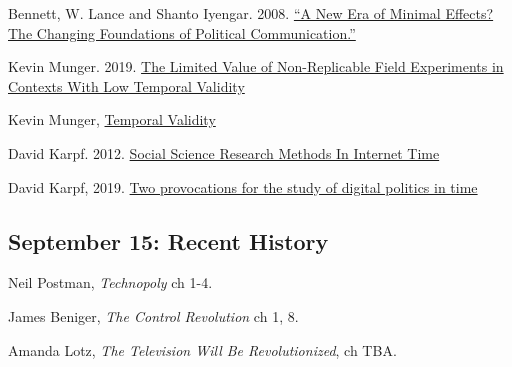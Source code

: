 \vspace{-.1in}\documentclass[11pt]{article}
\begin{document}
\noindent Bennett, W. Lance and Shanto Iyengar. 2008. \href{https://watermark.silverchair.com/jjnlcom0707.pdf?token=AQECAHi208BE49Ooan9kkhW_Ercy7Dm3ZL_9Cf3qfKAc485ysgAAAuMwggLfBgkqhkiG9w0BBwagggLQMIICzAIBADCCAsUGCSqGSIb3DQEHATAeBglghkgBZQMEAS4wEQQMxeWmnFmyhtJ1QIhvAgEQgIIClvh7EVCxMWBMC914ltsWhroj0SSXor8T5zs_WNx5ROp4s7nw6UtLcbtgtw8yXDv5GvqR200PI2XpdGtp9Nz11PuXIktWBU3SawPu_RbYz82G-iGCsafeQT4W8o6TO_nsjaFSF_m4M_ON1ECqmh3-oH6wXkCUrbgBdW26hl08OWeJy_bloCzMpGfYmb9y4j8JI20QcaNlWuB9Wx2uQgfwi06Eo1kyHmnmSVV9H4nXKK4iWmPwy8uSsdMkkUTpc15dtVtGgI_DKiQN66NVzqg-70vY5dSjjOKO61nNJZzjZy_r0TY3D-5xL2TmxEyn_09gHaWFkUf8wIcorY5xTTDd7-K08ee1jeeSQE-xaoCbkHSh_XhZVGT5OBiVy5KDhrDMe6ZMPp_DVqfKohzHNMoMRHlaiMXVLhLkDUXmFA9Xxk0jdKRKdmoaloKpKOsxN3pvU5GGu-NM4MXBkdlZmIvOnFP0vsEMoqH-1Y1YeupnnkAMh2ATKDpz_nFQK_84THWs-YsnzqnUm76PeRjKw_1fqjiZyg0kaHjP2EBHdg3qZjno1sa06y_ZM0FGklD7I5pXxbXFPIO4DjphpWHra-cKUZTImlIKcA-c27J5Yb5VCmFvI7RPcCM1SU-IZQPOkTQqzHcm211jURLtQ6rOj0umWzNh9-Cx065iMxFZJs7urqiDPYIvPeJgbCtm3NDDHQWRxzilqoXmN2kor3m7Bq-pUiDRd-TPyNtAKO4mEB_AYiLb7fJLnJ9VidSAWj9mfqXNX8qfyW0ozReaidr4DOKUX9q-OT-fm3zzwYaQpUqxHOHiLysY_fpGJ0erbJ1QAq7ihVHRuVFajJ1oc1gXj-F4G28qw4v54T1ve3_r4pxxYlSmZPdaMb7y}{``A New Era of Minimal Effects? The Changing Foundations of Political Communication.'' }


\noindent Kevin Munger. 2019. \href{https://journals.sagepub.com/doi/full/10.1177/2056305119859294}{The Limited Value of Non-Replicable Field Experiments in Contexts With Low Temporal Validity}


\noindent Kevin Munger, \href{https://osf.io/ca5wz/}{Temporal Validity}

\noindent David Karpf. 2012. \href{http://sciencepolicy.colorado.edu/students/envs_5720/karpf_2012.pdf}{Social Science Research Methods In Internet Time }

\noindent David Karpf, 2019. \href{https://www.tandfonline.com/doi/abs/10.1080/19331681.2019.1705222}{Two provocations for the study of digital politics in time}



\subsection*{September 15: Recent History}


Neil Postman, \textit{Technopoly} ch 1-4.

\noindent James Beniger, \textit{The Control Revolution} ch 1, 8.

\noindent Amanda Lotz, \textit{The Television Will Be Revolutionized}, ch TBA.
\end{document}
